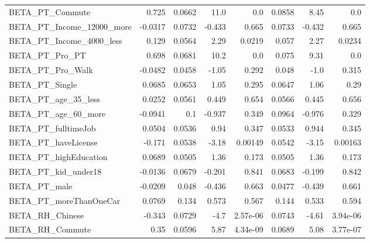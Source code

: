 \begin{tabular}{lrrrrrrr}
BETA\_PT\_Commute              &    0.725 &   0.0662 &    11.0 &      0.0 &        0.0858 &         8.45 &           0.0 \\
BETA\_PT\_Income\_12000\_more    &  -0.0317 &   0.0732 &  -0.433 &    0.665 &        0.0733 &       -0.432 &         0.665 \\
BETA\_PT\_Income\_4000\_less     &    0.129 &   0.0564 &    2.29 &   0.0219 &         0.057 &         2.27 &        0.0234 \\
BETA\_PT\_Pro\_PT               &    0.698 &   0.0681 &    10.2 &      0.0 &         0.075 &         9.31 &           0.0 \\
BETA\_PT\_Pro\_Walk             &  -0.0482 &   0.0458 &   -1.05 &    0.292 &         0.048 &         -1.0 &         0.315 \\
BETA\_PT\_Single               &   0.0685 &   0.0653 &    1.05 &    0.295 &        0.0647 &         1.06 &          0.29 \\
BETA\_PT\_age\_35\_less          &   0.0252 &   0.0561 &   0.449 &    0.654 &        0.0566 &        0.445 &         0.656 \\
BETA\_PT\_age\_60\_more          &  -0.0941 &      0.1 &  -0.937 &    0.349 &        0.0964 &       -0.976 &         0.329 \\
BETA\_PT\_fulltimeJob          &   0.0504 &   0.0536 &    0.94 &    0.347 &        0.0533 &        0.944 &         0.345 \\
BETA\_PT\_haveLicense          &   -0.171 &   0.0538 &   -3.18 &  0.00149 &        0.0542 &        -3.15 &       0.00163 \\
BETA\_PT\_highEducation        &   0.0689 &   0.0505 &    1.36 &    0.173 &        0.0505 &         1.36 &         0.173 \\
BETA\_PT\_kid\_under18          &  -0.0136 &   0.0679 &  -0.201 &    0.841 &        0.0683 &       -0.199 &         0.842 \\
BETA\_PT\_male                 &  -0.0209 &    0.048 &  -0.436 &    0.663 &        0.0477 &       -0.439 &         0.661 \\
BETA\_PT\_moreThanOneCar       &   0.0769 &    0.134 &   0.573 &    0.567 &         0.144 &        0.533 &         0.594 \\
BETA\_RH\_Chinese              &   -0.343 &   0.0729 &    -4.7 & 2.57e-06 &        0.0743 &        -4.61 &      3.94e-06 \\
BETA\_RH\_Commute              &     0.35 &   0.0596 &    5.87 & 4.34e-09 &        0.0689 &         5.08 &      3.77e-07 \\

\end{tabular}
